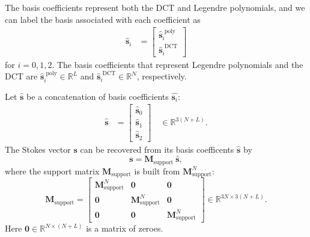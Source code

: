 \documentclass[10pt]{article}
\numberwithin{equation}{subsection}
\newcommand{\lbf}[1]{\ensuremath{{\boldsymbol #1}}}
\begin{document}
The basis coefficients represent both the DCT and Legendre polynomials, and we can label the basis associated with each coefficient as
    \begingroup
    \renewcommand*{\arraystretch}{1.5}
    \begin{align}
        \widehat{\lbf s}_i &= \begin{bmatrix}
            \widehat{\lbf s}_i^{\text{ poly}} \\
               \widehat{\lbf s}_i^{\text{ DCT}}
        \end{bmatrix}
    \end{align}
    \endgroup
for $i = 0, 1, 2$. The basis coefficients that represent Legendre polynomials and the DCT are $\widehat{\lbf s}_i^{\text{ poly}} \in \mathbb R^{L}$ and $\widehat{\lbf s}_i^{\text{ DCT}} \in \mathbb R^{N}$, respectively.

Let $\widehat{\lbf s}$ be a concatenation of basis coefficients $\widehat{\lbf s_i}$:
    \begin{align}
        \widehat{\lbf s} &= \begin{bmatrix}
               \widehat{\lbf s}_0 \\
               \widehat{\lbf s}_1 \\
               \widehat{\lbf s}_2
        \end{bmatrix} \quad \in \mathbb R^{3 (N + L)}.
    \end{align}
The Stokes vector $\lbf s$ can be recovered from its basis coefficents $\widehat{\lbf s}$ by
    \begin{equation}
            \lbf s = \lbf M_{\text{support}} ~\widehat{\lbf s},
            \label{eqn:RecoverStokes}
    \end{equation}
where the support matrix $\lbf M_{\text{support}}$ is built from $\lbf M_{\text{support}}^N$:
    \begingroup
    \renewcommand*{\arraystretch}{1.5}
    \begin{equation}
        \lbf M_{\text{support}} = \left[ \begin{array}{c|c|c}
            \lbf M_{\text{support}}^N & \lbf{0} & \lbf{0} \\ \hline
            \lbf{0} & \lbf M_{\text{support}}^N & \lbf{0} \\ \hline
            \lbf{0} & \lbf{0} & \lbf M_{\text{support}}^N
        \end{array} \right] \in \mathbb R^{3 N \times 3 (N + L)}.
        \label{Mbasis}
    \end{equation}
    \endgroup
Here $\lbf 0 \in \mathbb R^{N \times (N + L)}$ is a matrix of zeroes.
\end{document}
